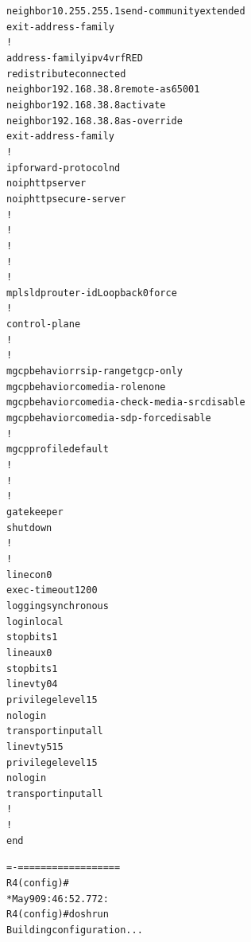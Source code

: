 \documentclass[12pt,twoside,a4paper]{report}
\begin{document}
{\begin{small}
\begin{alltt}
  neighbor 10.255.255.1 send-community extended
 exit-address-family
 !
 address-family ipv4 vrf RED
  redistribute connected
  neighbor 192.168.38.8 remote-as 65001
  neighbor 192.168.38.8 activate
  neighbor 192.168.38.8 as-override
 exit-address-family
!
ip forward-protocol nd
no ip http server
no ip http secure-server
!
!
!
!
!
mpls ldp router-id Loopback0 force
!
control-plane
!
!
mgcp behavior rsip-range tgcp-only
mgcp behavior comedia-role none
mgcp behavior comedia-check-media-src disable
mgcp behavior comedia-sdp-force disable
!
mgcp profile default
!
!
!
gatekeeper
 shutdown 
!
!
line con 0
 exec-timeout 120 0
 logging synchronous
 login local
 stopbits 1
line aux 0
 stopbits 1
line vty 0 4
 privilege level 15
 no login
 transport input all
line vty 5 15
 privilege level 15
 no login
 transport input all
!
!
end

=-==================
R4(config)#
*May  9 09:46:52.772: %
R4(config)#do sh run
Building configuration...


\end{alltt}
\end{small}}
\end{document}

